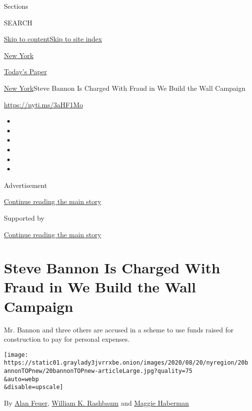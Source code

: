 Sections

SEARCH

\protect\hyperlink{site-content}{Skip to
content}\protect\hyperlink{site-index}{Skip to site index}

\href{https://www.nytimes3xbfgragh.onion/section/nyregion}{New York}

\href{https://myaccount.nytimes3xbfgragh.onion/auth/login?response_type=cookie\&client_id=vi}{}

\href{https://www.nytimes3xbfgragh.onion/section/todayspaper}{Today's
Paper}

\href{/section/nyregion}{New York}\textbar{}Steve Bannon Is Charged With
Fraud in We Build the Wall Campaign

\url{https://nyti.ms/3aHF1Mo}

\begin{itemize}
\item
\item
\item
\item
\item
\item
\end{itemize}

Advertisement

\protect\hyperlink{after-top}{Continue reading the main story}

Supported by

\protect\hyperlink{after-sponsor}{Continue reading the main story}

\hypertarget{steve-bannon-is-charged-with-fraud-in-we-build-the-wall-campaign}{%
\section{Steve Bannon Is Charged With Fraud in We Build the Wall
Campaign}\label{steve-bannon-is-charged-with-fraud-in-we-build-the-wall-campaign}}

Mr. Bannon and three others are accused in a scheme to use funds raised
for construction to pay for personal expenses.

\texttt{[image: https://static01.graylady3jvrrxbe.onion/images/2020/08/20/nyregion/20bannonTOPnew/20bannonTOPnew-articleLarge.jpg?quality=75\\\&auto=webp\\\&disable=upscale]}

By \href{https://www.nytimes3xbfgragh.onion/by/alan-feuer}{Alan Feuer},
\href{https://www.nytimes3xbfgragh.onion/by/william-k-rashbaum}{William
K. Rashbaum} and
\href{https://www.nytimes3xbfgragh.onion/by/maggie-haberman}{Maggie
Haberman}

